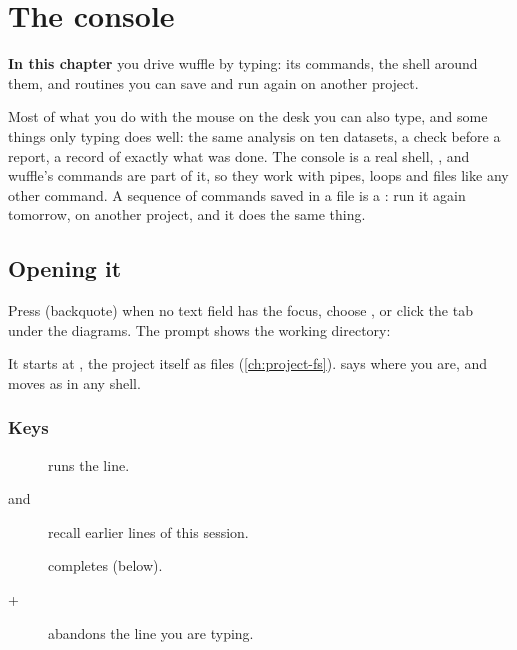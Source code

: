 \chapter{The console}\label{ch:console}
\begin{goals}
\textbf{In this chapter} you drive wuffle by typing: its commands, the shell around them, and routines
you can save and run again on another project.
\end{goals}

Most of what you do with the mouse on the desk you can also type, and some things only typing does well:
the same analysis on ten datasets, a check before a report, a record of exactly what was done. The console
is a real shell, , and wuffle's commands are part of it, so they work with pipes, loops and
files like any other command. A sequence of commands saved in a file is a : run it again
tomorrow, on another project, and it does the same thing.


\section{Opening it}\label{sec:console-open}

Press  (backquote) when no text field has the focus, choose , or click the
 tab under the diagrams. The prompt shows the working directory:


It starts at , the project itself as files (\cref{ch:project-fs}).  says where
you are, and  moves as in any shell.

\subsection{Keys}

\begin{description}
\item[] runs the line.
\item[ and ] recall earlier lines of this session.
\item[] completes (below).
\item[+] abandons the line you are typing.
\end{description}

